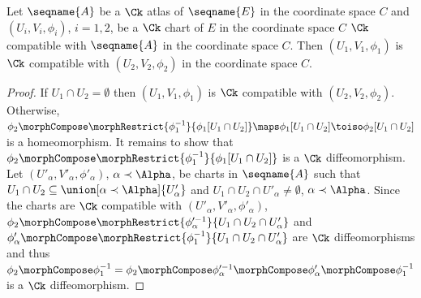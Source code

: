 \documentclass{article}
\begin{document}
\begin{lemma}
\label{Ck-atl:extensions}
Let $\seqname{A}$ be a $\Ck$ atlas of $\seqname{E}$ in the coordinate
space $C$ and $(U_i,V_i,\phi_i)$, $i=1,2$, be a $\Ck$ chart of $E$ in
the coordinate space $C$ $\Ck$ compatible with $\seqname{A}$ in the
coordinate space $C$. Then $(U_1,V_1,\phi_1)$ is $\Ck$ compatible with
$(U_2,V_2,\phi_2)$ in the coordinate space $C$.

\begin{proof}
If $U_1 \cap U_2 = \emptyset$ then $(U_1,V_1,\phi_1)$ is
$\Ck$ compatible with $(U_2,V_2,\phi_2)$. Otherwise,
$\phi_2 \morphCompose \morphRestrict{\phi^{-1}_1}{\phi_1[U_1 \cap U_2]} \maps
\phi_1[U_1 \cap U_2] \toiso \phi_2[U_1 \cap U_2]$
is a homeomorphism.  It remains to show that
$\phi_2 \morphCompose \morphRestrict{\phi^{-1}_1}{\phi_1[U_1 \cap U_2]}$
is a $\Ck$ diffeomorphism.
Let $(U'_\alpha,V'_\alpha,\phi'_\alpha)$, $\alpha \prec \Alpha$, be
charts in $\seqname{A}$ such that
$U_1 \cap U_2 \subseteq \union[\alpha \prec \Alpha]{U'_\alpha}$ and
$U_1 \cap U_2 \cap U'_\alpha \neq \emptyset$, $\alpha \prec \Alpha$.
Since the charts are $\Ck$ compatible with $(U'_\alpha,V'_\alpha,\phi'_\alpha)$,
$\phi_2 \morphCompose \morphRestrict{\phi'^{-1}_\alpha}{U_1 \cap U_2 \cap U'_\alpha}$
and
$\phi'_\alpha \morphCompose \morphRestrict{\phi^{-1}_1}{U_1 \cap U_2 \cap U'_\alpha}$
are $\Ck$ diffeomorphisms and thus
$\phi_2 \morphCompose \phi^{-1}_1 = \phi_2 \morphCompose \phi'^{-1}_\alpha \morphCompose \phi'_\alpha \morphCompose \phi^{-1}_1$
is a $\Ck$ diffeomorphism.
\end{proof}
\end{lemma}
\end{document}
